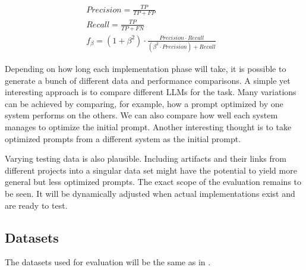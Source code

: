 
\begin{align}
    \label{eq:precision}
    Precision = \frac{TP}{TP + FP} &\\
    \label{eq:recall}
    Recall = \frac{TP}{TP + FN} &\\
    \label{eq:f_beta}
    f_{\beta} = (1 + \beta^2) \cdot \frac{Precision \cdot Recall}{(\beta^2 \cdot Precision) + Recall}
\end{align}



Depending on how long each implementation phase will take, it is possible to generate a bunch of different data and performance comparisons.
A simple yet interesting approach is to compare different LLMs for the task.
Many variations can be achieved by comparing, for example, how a prompt optimized by one system performs on the others.
We can also compare how well each system manages to optimize the initial prompt.
Another interesting thought is to take optimized prompts from a different system as the initial prompt.

Varying testing data is also plausible.
Including artifacts and their links from different projects into a singular data set might have the potential to yield more general but less optimized prompts. 
The exact scope of the evaluation remains to be seen.
It will be dynamically adjusted when actual implementations exist and are ready to test.


\subsection{Datasets}
\label{approach:sec:datasets}
The datasets used for evaluation will be the same as in .
